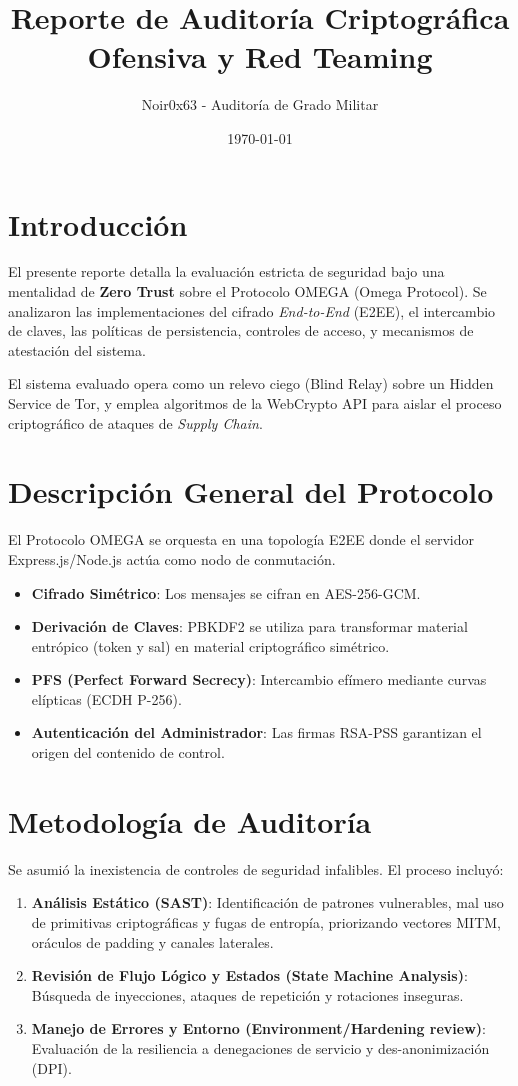 \documentclass[12pt,a4paper]{article}
\title{\textbf{\Huge{Reporte de Auditoría Criptográfica Ofensiva y Red Teaming}}}
\author{Noir0x63 - Auditoría de Grado Militar}
\date{\today}
\begin{document}
\maketitle

\section{Introducción}
El presente reporte detalla la evaluación estricta de seguridad bajo una mentalidad de \textbf{Zero Trust} sobre el Protocolo OMEGA (Omega Protocol). Se analizaron las implementaciones del cifrado \textit{End-to-End} (E2EE), el intercambio de claves, las políticas de persistencia, controles de acceso, y mecanismos de atestación del sistema.

El sistema evaluado opera como un relevo ciego (Blind Relay) sobre un Hidden Service de Tor, y emplea algoritmos de la WebCrypto API para aislar el proceso criptográfico de ataques de \textit{Supply Chain}.

\section{Descripción General del Protocolo}
El Protocolo OMEGA se orquesta en una topología E2EE donde el servidor Express.js/Node.js actúa como nodo de conmutación.
\begin{itemize}
    \item \textbf{Cifrado Simétrico}: Los mensajes se cifran en AES-256-GCM.
    \item \textbf{Derivación de Claves}: PBKDF2 se utiliza para transformar material entrópico (token y sal) en material criptográfico simétrico.
    \item \textbf{PFS (Perfect Forward Secrecy)}: Intercambio efímero mediante curvas elípticas (ECDH P-256).
    \item \textbf{Autenticación del Administrador}: Las firmas RSA-PSS garantizan el origen del contenido de control.
\end{itemize}

\section{Metodología de Auditoría}
Se asumió la inexistencia de controles de seguridad infalibles. El proceso incluyó:
\begin{enumerate}
    \item \textbf{Análisis Estático (SAST)}: Identificación de patrones vulnerables, mal uso de primitivas criptográficas y fugas de entropía, priorizando vectores MITM, oráculos de padding y canales laterales.
    \item \textbf{Revisión de Flujo Lógico y Estados (State Machine Analysis)}: Búsqueda de inyecciones, ataques de repetición y rotaciones inseguras.
    \item \textbf{Manejo de Errores y Entorno (Environment/Hardening review)}: Evaluación de la resiliencia a denegaciones de servicio y des-anonimización (DPI).
\end{enumerate}
\end{document}
